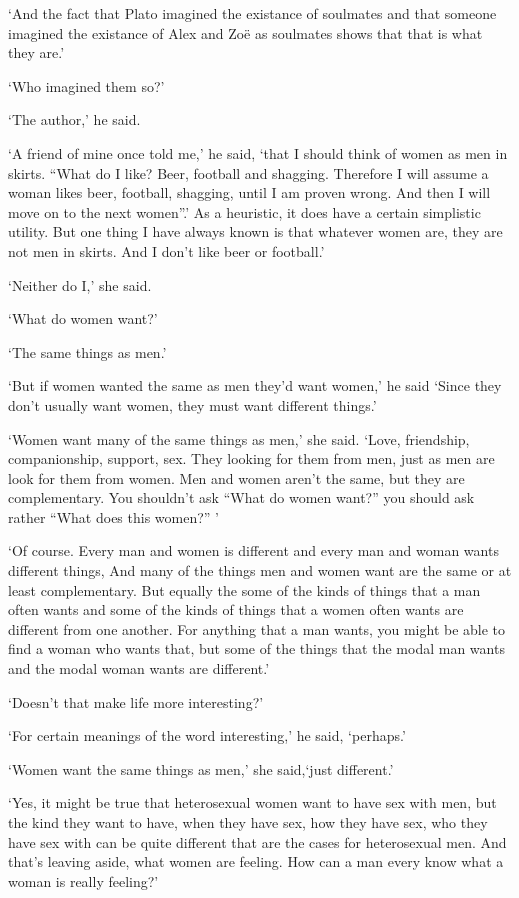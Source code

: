 `And the fact that Plato imagined the existance of soulmates and that someone imagined the existance of Alex and Zoë as soulmates shows that that is what they are.'

`Who imagined them so?'

`The author,' he said.

\majorbreak
`A friend of mine once told me,' he said, `that I should think of women as men
in skirts. ``What do I like? Beer, football and shagging.
Therefore I will assume a woman likes beer, football, shagging,
until I am proven wrong. And then I will move on to the
next women''.' As a heuristic, it does have a certain simplistic utility. But one thing I have always known is that whatever
women are, they are not men in skirts. And I don't like beer or football.'

`Neither do I,' she said.

`What do women want?'

`The same things as men.'

`But if women wanted the same as men they'd want women,' he said `Since they
don't usually want women, they must want different things.'

`Women want many of the same things as men,' she said. `Love,
friendship, companionship, support, sex. They looking for
them from men, just as men are look for them from women. Men and
women aren't the same, but they are complementary. You
shouldn't ask ``What do women want?'' you should ask rather ``What
does {\twelveit this\/} women?'' '

`Of course. Every man and women is different and every man and woman
wants different things, And many of the things men and women want
are the same or at least complementary. But equally the some of the
kinds of things that a man often wants and some of the kinds of
things that a women often wants are different from one another. For
anything that a man wants, you might be able to find a woman who wants
that, but some of the things that the modal man wants and the modal
woman wants are different.'

`Doesn't that make life more interesting?'

`For certain meanings of the word {\twelveit interesting},' he said, `perhaps.'

`Women want the same things as men,' she said,`just different.'

`Yes, it might be true that heterosexual women want to have sex with
men, but the kind they want to have, when they have sex, how they
have sex, who they have sex with can be quite different that are the
cases for heterosexual men. And that's leaving aside, what women are
feeling. How can a man every know what a woman is really feeling?'

